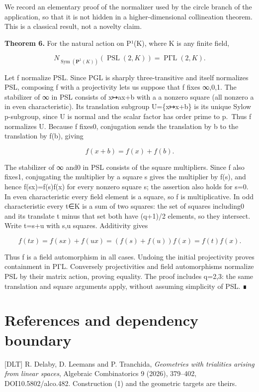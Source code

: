 \documentclass[
  11pt,
  a4paper,
]{article}
\begin{document}
We record an elementary proof of the normalizer used by the circle
branch of the application, so that it is not hidden in a
higher-dimensional collineation theorem. This is a classical result, not
a novelty claim.

\textbf{Theorem 6.} For the natural action on P¹(K), where K is any
finite field,

\[
 N_{\operatorname{Sym}(\mathbf P^1(K))}
   (\operatorname{PSL}(2,K))=\operatorname{P\Gamma L}(2,K).
\tag{9}
\]

Let f normalize PSL. Since PGL is sharply three-transitive and itself
normalizes PSL, composing f with a projectivity lets us suppose that f
fixes ∞,0,1. The stabilizer of ∞ in PSL consists of x↦ax+b with a a
nonzero square (all nonzero a in even characteristic). Its translation
subgroup U=\{x↦x+b\} is its unique Sylow p-subgroup, since U is normal
and the scalar factor has order prime to p.~Thus f normalizes U. Because
f fixes0, conjugation sends the translation by b to the translation by
f(b), giving

\[
 f(x+b)=f(x)+f(b).
\tag{10}
\]

The stabilizer of ∞ and0 in PSL consists of the square multipliers.
Since f also fixes1, conjugating the multiplier by a square s gives the
multiplier by f(s), and hence f(sx)=f(s)f(x) for every nonzero square s;
the assertion also holds for s=0. In even characteristic every field
element is a square, so f is multiplicative. In odd characteristic every
t∈K is a sum of two squares: the set of squares including0 and its
translate t minus that set both have (q+1)/2 elements, so they
intersect. Write t=s+u with s,u squares. Additivity gives

\[
 f(tx)=f(sx)+f(ux)=(f(s)+f(u))f(x)=f(t)f(x).
\]

Thus f is a field automorphism in all cases. Undoing the initial
projectivity proves containment in PΓL. Conversely projectivities and
field automorphisms normalize PSL by their matrix action, proving
equality. The proof includes q=2,3: the same translation and square
arguments apply, without assuming simplicity of PSL. ∎

\section{References and dependency
boundary}\label{references-and-dependency-boundary}

{[}DLT{]} R. Delaby, D. Leemans and P. Tranchida, \emph{Geometries with
trialities arising from linear spaces}, Algebraic Combinatorics 9
(2026), 379--402, DOI10.5802/alco.482. Construction (1) and the
geometric targets are theirs.
\end{document}
